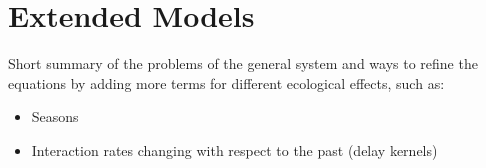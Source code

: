 \documentclass[12pt]{article}
\begin{document}
\section{Extended Models}

Short summary of the problems of the general system and ways to refine the equations by adding more terms for different ecological effects, such as:
\begin{itemize}
    \item Seasons
    \item Interaction rates changing with respect to the past (delay kernels)
\end{itemize}



\newpage
\nocite{*}
\printbibliography
\end{document}
